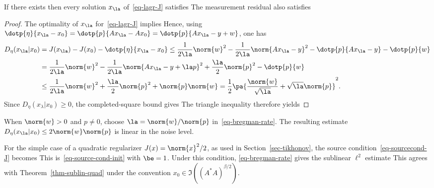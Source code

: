 \begin{thm}\label{thm-bregman-rates}
	If there exists 
    then every solution $x_\la$ of~\eqref{eq-lagr-J} satisfies
    The measurement residual also satisfies
\end{thm}
\begin{proof}
	The optimality of $x_\la$ for~\eqref{eq-lagr-J} implies
	Hence, using $\dotp{\eta}{x_\la-x_0} = \dotp{p}{Ax_\la-Ax_0} = \dotp{p}{A x_\la - y+w}$, one has
	\begin{align*}
		D_\eta(x_\la|x_0) &= J(x_\la)-J(x_0)-\dotp{\eta}{x_\la-x_0} 
			\leq \frac{1}{2\la}\norm{w}^2 - \frac{1}{2\la}\norm{Ax_\la-y}^2 -\dotp{p}{A x_\la-y} - \dotp{p}{w} \\
			& = \frac{1}{2\la}\norm{w}^2 - \frac{1}{2\la}\norm{Ax_\la-y + \la p }^2 + \frac{\la}{2} \norm{p}^2 - \dotp{p}{w} \\
			& \leq \frac{1}{2\la}\norm{w}^2 + \frac{\la}{2} \norm{p}^2 + \norm{p}\norm{w}
			= \frac{1}{2}\pa{ \frac{\norm{w}}{\sqrt{\la}} + \sqrt{\la}\norm{p} }^2.
	\end{align*}
Since $D_\eta(x_\lambda|x_0)\geq0$, the completed-square bound gives
The triangle inequality therefore yields

\end{proof}

When $\norm{w}>0$ and $p\neq0$, choose $\la=\norm{w}/\norm{p}$ in~\eqref{eq-bregman-rate}. The resulting estimate $D_\eta( x_\la|x_0 ) \leq 2 \norm{w}\norm{p}$ is linear in the noise level.
 
For the simple case of a quadratic regularizer $J(x)=\norm{x}^2/2$, as used in Section~\ref{sec-tikhonov}, the source condition~\eqref{eq-sourcecond-J} becomes
This is~\eqref{eq-source-cond-init} with $\be=1$. Under this condition, \eqref{eq-bregman-rate} gives the sublinear $\ell^2$ estimate
This agrees with Theorem~\ref{thm-sublin-quad} under the convention $x_0\in\Im((A^*A)^{\beta/2})$.

